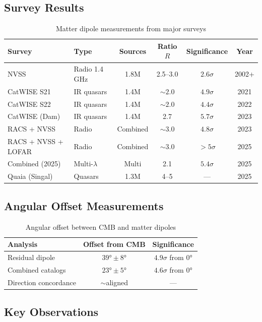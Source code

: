 \documentclass[12pt,a4paper]{article}
\begin{document}
\subsection{Survey Results}

\begin{table}[H]
\centering
\caption{Matter dipole measurements from major surveys}
\begin{tabular}{llcccc}
\toprule
Survey & Type & Sources & Ratio $R$ & Significance & Year \\
\midrule
NVSS & Radio 1.4 GHz & 1.8M & 2.5--3.0 & $2.6\sigma$ & 2002+ \\
CatWISE S21 & IR quasars & 1.4M & $\sim 2.0$ & $4.9\sigma$ & 2021 \\
CatWISE S22 & IR quasars & 1.4M & $\sim 2.0$ & $4.4\sigma$ & 2022 \\
CatWISE (Dam) & IR quasars & 1.4M & 2.7 & $5.7\sigma$ & 2023 \\
RACS + NVSS & Radio & Combined & $\sim 3.0$ & $4.8\sigma$ & 2023 \\
RACS + NVSS + LOFAR & Radio & Combined & $\sim 3.0$ & $>5\sigma$ & 2025 \\
Combined (2025) & Multi-$\lambda$ & Multi & 2.1 & $5.4\sigma$ & 2025 \\
Quaia (Singal) & Quasars & 1.3M & 4--5 & --- & 2025 \\
\bottomrule
\end{tabular}
\end{table}

\subsection{Angular Offset Measurements}

\begin{table}[H]
\centering
\caption{Angular offset between CMB and matter dipoles}
\begin{tabular}{lcc}
\toprule
Analysis & Offset from CMB & Significance \\
\midrule
Residual dipole & $39° \pm 8°$ & $4.9\sigma$ from $0°$ \\
Combined catalogs & $23° \pm 5°$ & $4.6\sigma$ from $0°$ \\
Direction concordance & $\sim$aligned & --- \\
\bottomrule
\end{tabular}
\end{table}

\subsection{Key Observations}
\end{document}
